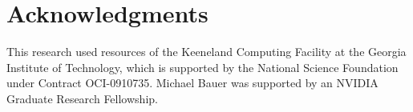 \documentclass[conference]{IEEEtran}
\begin{document}








\section*{Acknowledgments}
This research used resources of the Keeneland Computing Facility at the
Georgia Institute of Technology, which is supported by the National
Science Foundation under Contract OCI-0910735.  Michael Bauer was supported
by an NVIDIA Graduate Research Fellowship.


\end{document}
